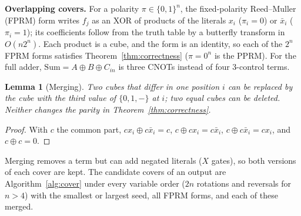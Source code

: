 \documentclass[conference]{IEEEtran}
\theoremstyle{plain}
\newtheorem{lemma}{Lemma}
\begin{document}
\textbf{Overlapping covers.} For a polarity $\pi\in\{0,1\}^n$, the
fixed-polarity Reed--Muller (FPRM) form writes $f_j$ as an XOR of
products of the literals $x_i$ ($\pi_i=0$) or $\bar x_i$ ($\pi_i=1$);
its coefficients follow from the truth table by a butterfly transform in
$O(n2^n)$. Each product is a cube, and the form is an identity, so each
of the $2^n$ FPRM forms satisfies Theorem~\ref{thm:correctness}
($\pi=0^n$ is the PPRM). For the full adder, $\mathrm{Sum}=A\oplus
B\oplus C_{in}$ is three CNOTs instead of four 3-control terms.
\begin{lemma}[Merging]
\label{lem:merge}
Two cubes that differ in one position $i$ can be replaced by the cube
with the third value of $\{0,1,-\}$ at $i$; two equal cubes can be
deleted. Neither changes the parity in Theorem~\ref{thm:correctness}.
\end{lemma}
\begin{proof}
With $c$ the common part, $c x_i\oplus c\bar x_i=c$, $c\oplus cx_i=c\bar
x_i$, $c\oplus c\bar x_i=cx_i$, and $c\oplus c=0$.
\end{proof}
Merging removes a term but can add negated literals ($X$ gates), so
both versions of each cover are kept. The candidate covers of an output
are Algorithm~\ref{alg:cover} under every variable order ($2n$
rotations and reversals for $n>4$) with the smallest or largest seed,
all FPRM forms, and each of these merged.
\end{document}
